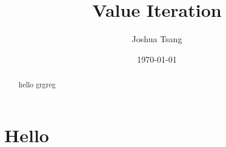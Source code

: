 \documentclass[a4paper,11pt]{article}
\title{Value Iteration}
\author{Joshua Tsang}
\date{\today}
\begin{document}
\maketitle
\tableofcontents

\begin{abstract}
hello grgreg 
\end{abstract}

\section{Hello}
\end{document}
